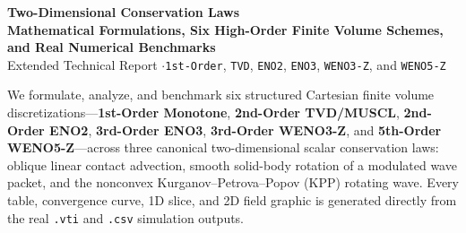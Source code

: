\documentclass[11pt,a4paper]{article}
\newcommand{\code}[1]{\texttt{#1}}
\theoremstyle{definition}
\begin{document}
\begin{center}
  {\LARGE\bfseries\color{specnavy} Two-Dimensional Conservation Laws}\\[4pt]
  {\large\bfseries\color{black} Mathematical Formulations, Six High-Order Finite Volume Schemes,\\[2pt] and Real Numerical Benchmarks}\\[5pt]
  {\small\textcolor{muted}{Extended Technical Report \quad$\cdot$\quad \code{1st-Order}, \code{TVD}, \code{ENO2}, \code{ENO3}, \code{WENO3-Z}, and \code{WENO5-Z}}}
\end{center}

\vspace{2mm}
\noindent We formulate, analyze, and benchmark six structured Cartesian finite volume discretizations---\textbf{1st-Order Monotone}, \textbf{2nd-Order TVD/MUSCL}, \textbf{2nd-Order ENO2}, \textbf{3rd-Order ENO3}, \textbf{3rd-Order WENO3-Z}, and \textbf{5th-Order WENO5-Z}---across three canonical two-dimensional scalar conservation laws: oblique linear contact advection, smooth solid-body rotation of a modulated wave packet, and the nonconvex Kurganov--Petrova--Popov (KPP) rotating wave. Every table, convergence curve, 1D slice, and 2D field graphic is generated directly from the real \code{.vti} and \code{.csv} simulation outputs.
\end{document}
